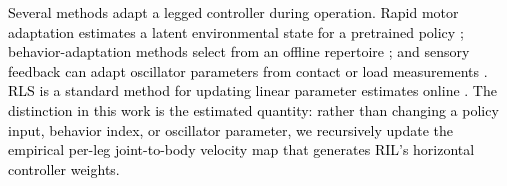 \documentclass[a4paper, 10pt, conference]{ieeeconf}
\newcommand{\vB}{v_B}
\newcommand{\Jm}{J}
\newcommand{\oldtext}[1]{\textcolor{red}{}}
\newcommand{\newtext}[1]{\textcolor{black}{#1}}
\begin{document}
\newtext{Several methods adapt a legged controller during operation. Rapid motor
adaptation estimates a latent environmental state for a pretrained policy
\cite{kumar2021}; behavior-adaptation methods select from an offline repertoire
\cite{cully2015}; and sensory feedback can adapt oscillator parameters from
contact or load measurements \cite{miguelblanco2020,suzuki2019}. RLS is a
standard method for updating linear parameter estimates online
\cite{ljung1999,astrom1995}. The distinction in this work is the estimated
quantity: rather than changing a policy input, behavior index, or oscillator
parameter, we recursively update the empirical per-leg joint-to-body velocity map
that generates RIL's horizontal controller weights.}



\end{document}
